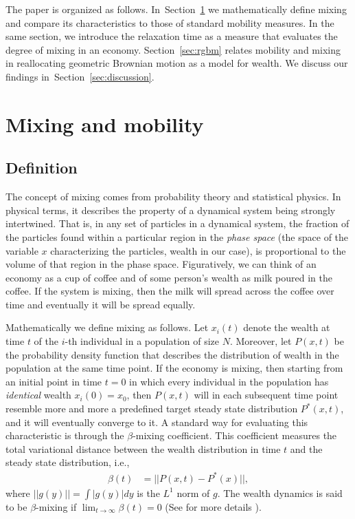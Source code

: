 \documentclass[11pt]{article}
\newcommand{\blue}[1]{{\color{blue} #1}}
\newcommand{\Sref}[1]{Section~\ref{sec:#1}}
\newcommand{\YB}[1]{\blue{{\it YB: #1 YB}}}
\numberwithin{equation}{section}
\begin{document}
The paper is organized as follows. In~\Sref{mixing-time} we mathematically define mixing and compare its characteristics to those of standard mobility measures. In the same section, we introduce the relaxation time as a measure that evaluates the degree of mixing in an economy. \Sref{rgbm} relates mobility and mixing in reallocating geometric Brownian motion as a model for wealth. We discuss our findings in~\Sref{discussion}.

\section{Mixing and mobility}
\label{sec:mixing-time}

\subsection{Definition}


The concept of mixing comes from probability theory and statistical physics. In physical terms, it describes the property of a dynamical system being strongly intertwined. That is, in any set of particles in a dynamical system, the fraction of the particles found within a particular region in the \textit{phase space} (the space of the variable $x$ characterizing the particles, wealth in our case), is proportional to the volume of that region in the phase space. Figuratively, we can think of an economy as a cup of coffee and of some person's wealth as milk poured in the coffee. If the system is mixing, then the milk will spread across the coffee over time  and eventually it will be spread equally.
 
Mathematically we define mixing as follows. Let $x_i(t)$ denote the wealth at time $t$ of the $i$-th individual in a population of size $N$. Moreover, let $P(x,t)$ be the probability density function that describes the distribution of wealth in the population at the same time point. If the economy is mixing, then starting from an initial point in time $t = 0$ in which every individual in the population has \textit{identical} wealth $x_i(0) = x_0$, then $P(x,t)$ will in each subsequent time point resemble more and more a predefined target steady state distribution $P^*(x,t)$, and it will eventually converge to it. A standard way for evaluating this characteristic is through the $\beta$-mixing coefficient. This coefficient measures the total variational distance between the wealth distribution in time $t$ and the steady state distribution, i.e.,
\begin{align*}
    \beta(t) &= || P(x,t) - P^*(x) ||,
\end{align*}
where $||g(y)|| = \int |g(y)| dy$ is the $L^1$ norm of $g$. The wealth dynamics is said to be $\beta$-mixing if $\lim_{t \to\infty} \beta(t) = 0$ (See for more details \citep{drees2000weighted}). %
\end{document}
